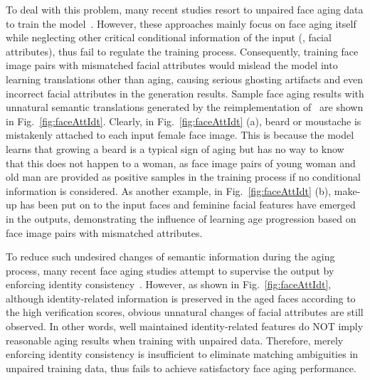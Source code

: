 \documentclass[10pt,twocolumn,letterpaper]{article}
\begin{document}
To deal with this problem, many recent studies resort to unpaired face aging data to train the model~\cite{wang2016recurrent,zhang2017age,yang2017learning,li2018global}.
However, these approaches mainly focus on face aging itself while neglecting other critical conditional information of the input (\eg, facial attributes), thus fail to regulate the training process. 
Consequently, training face image pairs with mismatched facial attributes would mislead the model into learning translations other than aging, causing serious ghosting artifacts and even incorrect facial attributes in the generation results.
Sample face aging results with unnatural semantic translations generated by the reimplementation of~\cite{yang2017learning} are shown in Fig.~\ref{fig:faceAttIdt}.
Clearly, in Fig.~\ref{fig:faceAttIdt} (a), beard or moustache is mistakenly attached to each input female face image. 
This is because the model learns that growing a beard is a typical sign of aging but has no way to know that this does not happen to a woman, as face image pairs of young woman and old man are provided as positive samples in the training process if no conditional information is considered.
As another example, in Fig.~\ref{fig:faceAttIdt} (b), make-up has been put on to the input faces and feminine facial features have emerged in the outputs, demonstrating the influence of learning age progression based on face image pairs with mismatched attributes.

To reduce such undesired changes of semantic information during the aging process, many recent face aging studies attempt to supervise the output by enforcing identity consistency~\cite{zhang2017age,antipov2017face,yang2017learning,li2018global}. 
However, as shown in Fig.~\ref{fig:faceAttIdt}, although identity-related information is preserved in the aged faces according to the high verification scores, obvious unnatural changes of facial attributes are still observed.
In other words, well maintained identity-related features do NOT imply reasonable aging results when training with unpaired data. Therefore, merely enforcing identity consistency is insufficient to eliminate matching ambiguities in unpaired training data, thus fails to achieve satisfactory face aging performance.
\end{document}

